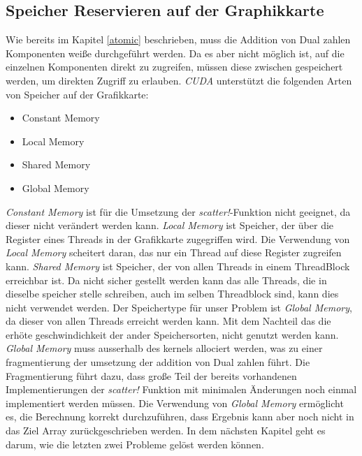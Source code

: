 \subsection{Speicher Reservieren auf der Graphikkarte} \label{sec:memory}

Wie bereits im Kapitel \ref{atomic} beschrieben, 
muss die Addition von Dual zahlen Komponenten weiße durchgeführt werden.
Da es aber nicht möglich ist, auf die einzelnen Komponenten direkt zu zugreifen,
müssen diese zwischen gespeichert werden, um direkten Zugriff zu erlauben.
\textit{CUDA} \cite{besard2018juliagpu} unterstützt die folgenden Arten von Speicher auf der Grafikkarte:

\begin{itemize}
	\item Constant Memory
	\item Local Memory
	\item Shared Memory
	\item Global Memory
\end{itemize}

\textit{Constant Memory} ist für die Umsetzung der \textit{scatter!}-Funktion nicht geeignet,
da dieser nicht verändert werden kann.
\textit{Local Memory} ist Speicher, 
der über die Register eines Threads in der Grafikkarte zugegriffen wird.
Die Verwendung von \textit{Local Memory} scheitert daran, 
das nur ein Thread auf diese Register zugreifen kann.
\textit{Shared Memory} ist Speicher, 
der von allen Threads in einem ThreadBlock erreichbar ist.
Da nicht sicher gestellt werden kann das alle Threads, 
die in dieselbe speicher stelle schreiben, auch im selben Threadblock sind,
kann dies nicht verwendet werden.
Der Speichertype für unser Problem ist \textit{Global Memory}, 
da dieser von allen Threads erreicht werden kann.
Mit dem Nachteil das die erhöte geschwindichkeit der ander Speichersorten, 
nicht genutzt werden kann.
\textit{Global Memory} muss ausserhalb des kernels allociert werden, 
was zu einer fragmentierung der umsetzung der addition von Dual zahlen führt.
Die Fragmentierung führt dazu, 
dass große Teil der bereits vorhandenen Implementierungen der \textit{scatter!} Funktion mit minimalen Änderungen noch einmal
implementiert werden müssen.
Die Verwendung von \textit{Global Memory} ermöglicht es, die Berechnung korrekt durchzuführen,
dass Ergebnis kann aber noch nicht in das Ziel Array zurückgeschrieben werden.
In dem nächsten Kapitel geht es darum, wie die letzten zwei Probleme gelöst werden können.
